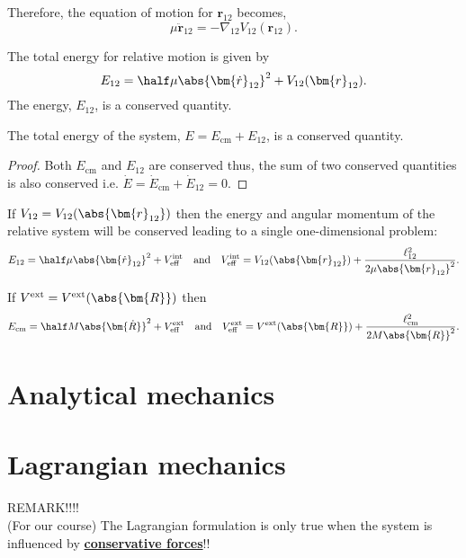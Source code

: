 \documentclass[12pt, a4paper]{article}
\begin{document}
Therefore, the equation of motion for \(\bm{r}_{12}\) becomes,
\[\mu \bm{\ddot{r}}_{12} = - \nabla_{12} V_{12}(\bm{r}_{12}).\]

\begin{mdthm}
    The total energy for relative motion is given by
    \[E_{12} = \half \mu \abs{\bm{\dot{r}}_{12}}^2 +V_{12}(\bm{r}_{12}).\]
    The energy, \(E_{12}\), is a conserved quantity.
\end{mdthm}

\begin{mdcor}
    The total energy of the system, \(E = E_{\text{cm}}+E_{12}\), is a conserved quantity.
\end{mdcor}

\begin{proof}
    Both \(E_{\text{cm}}\) and \(E_{12}\) are conserved thus, the sum of two conserved quantities is also conserved i.e. \(\dot{E}= \dot{E}_{\text{cm}}+\dot{E}_{12} = 0\).
\end{proof}

\begin{mdthm}
    If \(V_{12} = V_{12}(\abs{\bm{r}_{12}})\) then the energy and angular momentum of the relative system will be conserved leading to a single one-dimensional problem:
    \[E_{12} = \half \mu \abs{\bm{\dot{r}}_{12}}^2 + V_{\text{eff}}^{\text{int}} \quad \text{and} \quad V_{\text{eff}}^{\text{int}} = V_{12}(\abs{\bm{r}_{12}})+ \frac{\ell^2_{12}}{2\mu \abs{\bm{r}_{12}}^2}.\]
\end{mdthm}

\begin{mdthm}
    If \(V^{\text{ext}} = V^{\text{ext}}(\abs{\bm{R}})\) then 
    \[E_{\text{cm}} = \half M \abs{\bm{\dot{R}}}^2 + V_{\text{eff}}^{\text{ext}} \quad \text{and} \quad V_{\text{eff}}^{\text{ext}} = V^{\text{ext}}(\abs{\bm{R}}) + \frac{\ell_{\text{cm}}^2}{2M \abs{\bm{R}}^2}.\]
\end{mdthm}

\pagebreak

\section*{Analytical mechanics}

\section{Lagrangian mechanics}

\begin{mdthm}
    REMARK!!!! \\
    (For our course) The Lagrangian formulation is only true when the system is influenced by \ul{\textbf{conservative forces}}!!
\end{mdthm}
\end{document}
